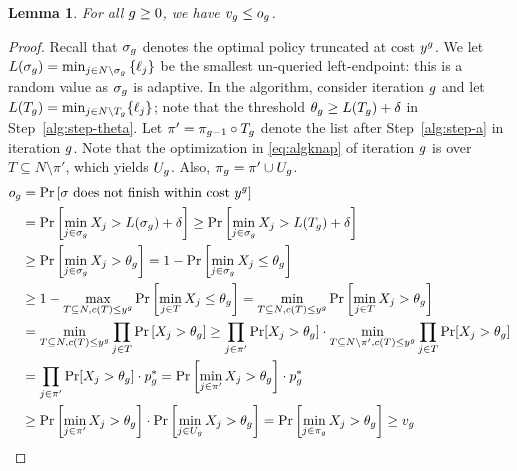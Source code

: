 \documentclass[11pt]{article}
\newcommand{\base}{y}
\newtheorem{lem}[thm]{Lemma}
\theoremstyle{remark}
\theoremstyle{plain}
\theoremstyle{remark}
\begin{document}
 \begin{lem} For all $g \ge 0$, we have $v_g \le o_g$. 
 \label{lem:aioi}
 \end{lem}
\begin{proof}
Recall that  $\sigma_g$ denotes the optimal policy truncated at cost $\base^\i$. We let $L(\sigma_g) = \min_{j \in  N \setminus {\sigma_g} }{\{\ell_j\}}$ be the smallest un-queried left-endpoint: this is a random value as $\sigma_g$ is adaptive. In the algorithm, consider iteration $g$ and let $L(T_{g})= \min_{j \in N\setminus T_{g}}\{\ell_j\}$; note that the threshold $\theta_g\ge L(T_{g}) +\delta$ in Step~\ref{alg:step-theta}. Let   $\pi'=\pi_{g-1}\circ T_g$ denote the list after Step~\ref{alg:step-a} in iteration $g$. Note   that the optimization in \eqref{eq:algknap} of iteration $g$ is over $T\subseteq N\setminus \pi'$, which yields $U_g$. Also, $\pi_g=\pi'\cup U_g$.
\begin{align}
   o_\i &= \Pr \left[\sigma \text{ does not finish within cost }\base^\i \right]\notag \\
    &= \Pr \left[ \min_{j \in \sigma_\i} X_j  > L(\sigma_\i) + \delta \right]  \ge \Pr \left[ \min_{j \in \sigma_\i} X_j  > L(T_\i) + \delta \right] \label{eq:li}  \\ 
    &\ge \Pr \left[ \min_{j \in \sigma_\i} X_j  > \theta_\i \right]  = 1- \Pr \left[ \min_{j \in \sigma_\i} X_j  \le \theta_\i \right]  \label{eq:opt-theta}  \\
    & \ge 1-  \max_{T \subseteq N, c(T) \leq \base^\i}{\Pr\left[ \min_{j \in {T}} X_j  \le \theta_\i \right]}  = \min_{T \subseteq N, c(T) \leq \base^\i} {\Pr\left[ \min_{j \in {T}} X_j  > \theta_\i \right]} \label{eq:statpol}\\
    & = \min_{T \subseteq N, c(T) \leq \base^\i}{\prod_{j\in T} \Pr\left[ X_j  > \theta_\i \right]} 
     \ge  \prod_{j \in \pi'}\Pr[ X_j  > \theta_\i ] \cdot \min_{T \subseteq N \setminus \pi', c(T) \leq \base^\i}
        \prod_{j\in T} \Pr[ X_j  >  \theta_\i ] \label{eq:stat} \\ 
    & =  \prod_{j \in \pi'}\Pr[ X_j  > \theta_\i ]  \cdot p_\i^* =  \Pr\left[ \min_{j \in \pi'} X_j > \theta_\i \right]  \cdot p_\i^* \label{eq:p} \\
    & \ge  {\Pr\left[ \min_{j \in \pi'} X_j > \theta_\i \right]} \cdot {\Pr\left[ \min_{j \in {U_\i}} X_j  > \theta_\i \right]}  =   {\Pr\left[ \min_{j \in \pi_{\i}} X_j  > \theta_\i \right]} \ge v_\i \label{eq:knap} 
\end{align}

\end{proof}
\end{document}
